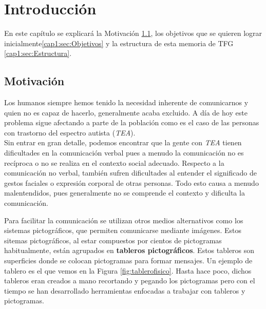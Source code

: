 \chapter{Introducción}
\label{cap:introduccion}


\begin{resumen} En este capítulo se explicará la Motivación \ref{cap1:sec:Motivacion}, los objetivos que se quieren lograr inicialmente\ref{cap1:sec:Objetivos} y la estructura de esta memoria de TFG \ref{cap1:sec:Estructura}. 
\end{resumen}
\section{Motivación}
\label{cap1:sec:Motivacion}

Los humanos siempre  hemos tenido la necesidad inherente de comunicarnos y quien no es capaz de hacerlo, generalmente acaba excluido. A día de hoy este problema sigue afectando a parte de la población como es el caso de las personas con trastorno del espectro autista (\textit{TEA}).\\

Sin entrar en gran detalle, podemos encontrar que la gente con \textit{TEA} tienen dificultades en la comunicación verbal pues a menudo la comunicación no es recíproca o no se realiza en el contexto social adecuado. Respecto a la comunicación no verbal, también sufren dificultades al entender el significado de gestos faciales o expresión corporal de otras personas. Todo esto causa a menudo malentendidos, pues generalmente no se comprende el contexto y dificulta la comunicación. 

Para facilitar la comunicación se utilizan otros medios alternativos como los sistemas pictográficos, que permiten comunicarse mediante imágenes. Estos sitemas pictográficos, al estar compuestos por cientos de pictogramas habitualmente, están agrupados en \textbf{tableros pictográficos}. Estos tableros son superficies donde se colocan pictogramas para formar mensajes. Un ejemplo de tablero es el que vemos en la Figura \ref{fig:tablerofisico}. Hasta hace poco, dichos tableros eran creados a mano recortando y pegando los pictogramas pero con el tiempo se han desarrollado herramientas enfocadas a trabajar con tableros y pictogramas.


